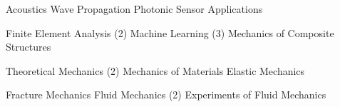 
\begin{coursework}

  \cvcoursev
    {Acoustics}
    {Wave Propagation}
    {Photonic Sensor Applications}


  \cvcoursev
    {Finite Element Analysis (2)}
    {Machine Learning (3)}
    {Mechanics of Composite Structures}

  \cvcoursev
    {Theoretical Mechanics (2)}
    {Mechanics of Materials}
    {Elastic Mechanics}

  \cvcoursev
    {Fracture Mechanics}
    {Fluid Mechanics (2)}
    {Experiments of Fluid Mechanics}

\end{coursework}
